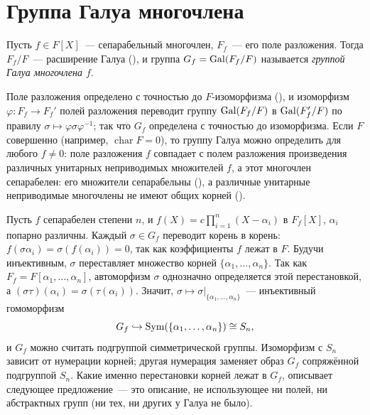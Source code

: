 \makeatletter
{}
\makeatother
\section{Группа Галуа многочлена}

\begin{definition}[3.27a]
Пусть $f\in F[X]$~--- сепарабельный многочлен, $F_f$~--- его поле разложения. Тогда $F_f/F$~--- расширение Галуа
(), и группа $G_f=\operatorname{Gal}(F_f/F)$ называется \emph{группой Галуа многочлена $f$}.
\end{definition}

Поле разложения определено с точностью до $F$-изоморфизма (), и изоморфизм $\varphi\colon F_f\to F_f'$ полей
разложения переводит группу $\operatorname{Gal}(F_f/F)$ в $\operatorname{Gal}(F_f'/F)$ по правилу $\sigma\mapsto\varphi\sigma\varphi^{-1}$; так что
$G_f$ определена с точностью до изоморфизма. Если $F$ совершенно (например, $\operatorname{char}F=0$), то группу Галуа
можно определить для любого $f\ne0$: поле разложения $f$ совпадает с полем разложения произведения различных
унитарных неприводимых множителей $f$, а этот многочлен сепарабелен: его множители сепарабельны (), а различные
унитарные неприводимые многочлены не имеют общих корней ().

Пусть $f$ сепарабелен степени $n$, и $f(X)=c\prod_{i=1}^n(X-\alpha_i)$ в $F_f[X]$, $\alpha_i$ попарно различны. Каждый
$\sigma\in G_f$ переводит корень в корень: $f(\sigma\alpha_i)=\sigma(f(\alpha_i))=0$, так как коэффициенты $f$ лежат в $F$.
Будучи инъективным, $\sigma$ переставляет множество корней $\{\alpha_1,\dots,\alpha_n\}$. Так как $F_f=F[\alpha_1,\dots,\alpha_n]$,
автоморфизм $\sigma$ однозначно определяется этой перестановкой, а $(\sigma\tau)(\alpha_i)=\sigma(\tau(\alpha_i))$. Значит,
$\sigma\mapsto\sigma|_{\{\alpha_1,\dots,\alpha_n\}}$~--- инъективный гомоморфизм
\[
G_f\hookrightarrow\operatorname{Sym}(\{\alpha_1,\dots,\alpha_n\})\cong S_n ,
\]
и $G_f$ можно считать подгруппой симметрической группы. Изоморфизм с $S_n$ зависит от нумерации корней; другая нумерация
заменяет образ $G_f$ сопряжённой подгруппой $S_n$. Какие именно перестановки корней лежат в $G_f$, описывает следующее
предложение~--- это описание, не использующее ни полей, ни абстрактных групп (ни тех, ни других у Галуа не было).

